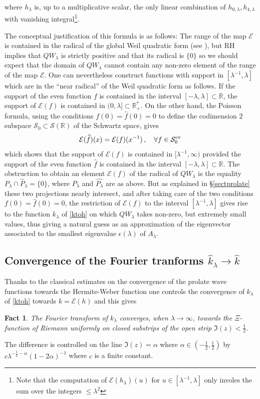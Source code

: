 \documentclass{article}
\newtheorem{fact}[thm]{Fact}
\def\cS{\mathcal{S}}
\def\sr0{{\cS^{\rm ev}_0}}
\def\sr0{{\cS^{\rm ev}_0}}
\def\R{{\mathbb R}}
\def\cE{{\mathcal E}}
\def\cS{{\mathcal S}}
\def\qqq{\,,\quad \forall}
\begin{document}
   where $h_\lambda$ is, up to a multiplicative scalar, the only linear combination of $h_{0,\lambda}, h_{4,\lambda}$ with vanishing integral\footnote{Note that the computation of $\cE(h_\lambda)(u)$ for $u\in [\lambda^{-1},\lambda]$ only involes the sum over the integers $\leq \lambda^2$}. 
   
   The conceptual justification of this formula is as follows: The range of the map $\cE$ is contained in the radical of the global Weil quadratic form (see \cite{CMbook}), but   RH implies that $QW_\lambda$ is strictly positive and that  its radical is $\{0\}$ so   we should expect that the domain of $QW_\lambda$ cannot contain any non-zero element of the range of the map $\cE$. One can nevertheless  construct   functions  with  support in $[\lambda^{-1},\lambda]$ which are in the ``near radical'' of the Weil quadratic form as follows.   If the support of the even function $f$ is contained in the interval $[-\lambda,\lambda]\subset \R$, the support of $\cE(f)$ is contained in $(0,\lambda]\subset \R_+^*$. On the other hand, the Poisson formula, using the conditions $f(0)=\widehat f(0)=0$ to define the codimension $2$ subspace $\mathcal S_0\subset \mathcal S(\R)$ of the Schwartz space, gives 
\begin{equation}
\cE(\widehat f)(x)=\cE(f)(x^{-1}) \qqq f\in \sr0\label{poissonintro}
\end{equation}
 which shows that the support of $\cE(f)$ is contained in $[\lambda^{-1},\infty)$ provided the support of the even function $\widehat f$ is contained in the interval $[-\lambda,\lambda]\subset \R$. The obstruction to obtain an element $\cE(f)$ of the radical of $QW_\lambda$ is the equality $P_\lambda \cap \widehat P_\lambda=\{0\} $, where  $P_\lambda$ and $\widehat{P_\lambda}$ are as above. But as explained in \S \ref{sectprolate} these two projections nearly intersect, and after taking care of the two conditions $f(0)=\widehat f(0)=0$,  the restriction of $\cE(f)$ to the interval $[\lambda^{-1},\lambda]$ gives rise to the function $k_\lambda$ of \eqref{ktoh}  on which $QW_\lambda$ takes non-zero, but extremely small values, thus giving a natural guess as  an approximation of the eigenvector associated to the smallest eigenvalue $\epsilon(\lambda)$ of $A_\lambda$.


 \subsection{Convergence of the Fourier tranforms  $\widehat k_\lambda\to \widehat k$}\label{sectconv}
 Thanks to the classical estimates on the convergence of the prolate wave functions towards the Hermite-Weber function one controls the convergence of $k_\lambda$ of \eqref{ktoh} towards $k=\cE(h)$ and this gives
 \begin{fact}\label{hermfact1} The Fourier transform of $k_\lambda$ converges, when $\lambda\to \infty$, towards the $\Xi$-function of Riemann uniformly on closed substrips of the open  strip $\Im(z)<\frac 12$.
\end{fact}
The difference is controlled on the line $\Im(z)=\alpha$ where $\alpha\in (-\frac 12, \frac 12)$ by $c\lambda ^{-\frac{1}{2}-\alpha }(1-2 \alpha)^{-1}$ where $c$ is a finite constant.
\end{document}
